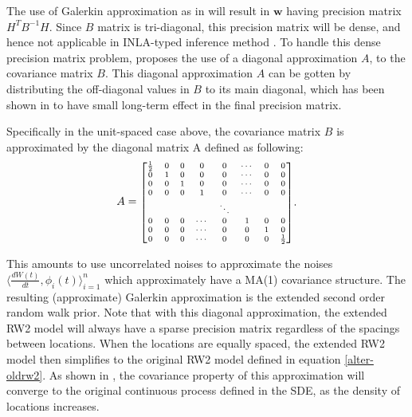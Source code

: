 \documentclass{article}
\begin{document}
The use of Galerkin approximation as in \cite{rw2} will result in $\boldsymbol w$ having precision matrix $H^TB^{-1}H$. Since $B$ matrix is tri-diagonal, this precision matrix will be dense, and hence not applicable in INLA-typed inference method \citep{inla}. To handle this dense precision matrix problem, \cite{rw2} proposes the use of a diagonal approximation $A$, to the covariance matrix $B$. This diagonal approximation $A$ can be gotten by distributing the off-diagonal values in $B$ to its main diagonal, which has been shown in \cite{rw2} to have small long-term effect in the final precision matrix.

Specifically in the unit-spaced case above, the covariance matrix $B$ is approximated by the diagonal matrix A defined as following:
\begin{equation}
\begin{aligned}
A = \mbox{\scriptsize $\begin{bmatrix}
\frac{1}{2} & 0 & 0 & 0 & 0 & \cdots & 0 & 0\\
0 & 1 & 0 & 0 & 0 & \cdots & 0 & 0\\
0 & 0 & 1 & 0 & 0 & \cdots & 0 & 0\\
0 & 0 & 0 & 1 & 0 & \cdots & 0 & 0\\
 &  &  &  & \ddots &  & & \\
 0 & 0 & 0 & \cdots & 0 & 1 & 0 & 0\\
0 & 0 & 0 & \cdots & 0 & 0 & 1 & 0\\
0 & 0 & 0 & \cdots & 0 & 0 & 0 & \frac{1}{2} \\
\end{bmatrix}$}
\end{aligned}.
\end{equation}

This amounts to use uncorrelated noises to approximate the noises $\langle \frac{dW(t)}{dt} , \phi_i(t)\rangle_{i=1}^n$
which approximately have a MA(1) covariance structure. The resulting (approximate) Galerkin approximation is the extended second order random walk prior. Note that with this diagonal approximation, the extended RW2 model will always have a sparse precision matrix regardless of the spacings between locations. When the locations are equally spaced, the extended RW2 model then simplifies to the original RW2 model defined in equation \ref{alter-oldrw2}. As shown in \cite{rw2}, the covariance property of this approximation will converge to the original continuous process defined in the SDE, as the density of locations increases.
\end{document}
